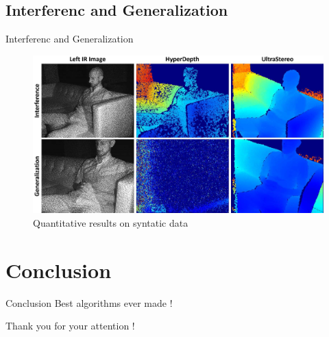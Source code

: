 \documentclass{beamer}
\begin{document}
\subsection{Interferenc and Generalization}
\begin{frame}{Interferenc and Generalization}
\begin{figure}
\includegraphics[scale=0.08]{pictures/fig8}
\caption{Quantitative results on syntatic data}
\end{figure}
\end{frame}

\section{Conclusion}
\begin{frame}{Conclusion}
Best algorithms ever made !
\end{frame}

\begin{frame}{}
\centering
\Huge{Thank you for your attention !}
\end{frame}
\end{document}
